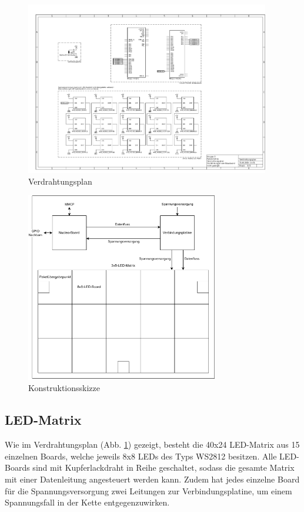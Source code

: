 \begin{figure}[H]
    \centering
    \includegraphics[angle=90,page=1,width=0.95\textwidth]{pdfs/Verdrahtungsplan.pdf} %
    \caption{Verdrahtungsplan}
    \label{fig:Verdrahtungsplan}
\end{figure}

\begin{figure}[H]
    \centering
    \includegraphics[width=0.75\textwidth]{pdfs/Konstruktionsskizze.pdf}
    \caption{Konstruktionsskizze}
    \label{fig:Konstruktionsskizze}
\end{figure}

\subsection{LED-Matrix}
Wie im Verdrahtungsplan (Abb. \ref{fig:Verdrahtungsplan}) gezeigt, besteht die 40x24 LED-Matrix aus 15 einzelnen Boards, welche jeweils 8x8 LEDs des Typs WS2812 besitzen. Alle LED-Boards sind mit Kupferlackdraht in Reihe geschaltet, sodass die gesamte Matrix mit einer Datenleitung angesteuert werden kann. Zudem hat jedes einzelne Board für die Spannungsversorgung zwei Leitungen zur Verbindungsplatine, um einem Spannungsfall in der Kette entgegenzuwirken.

